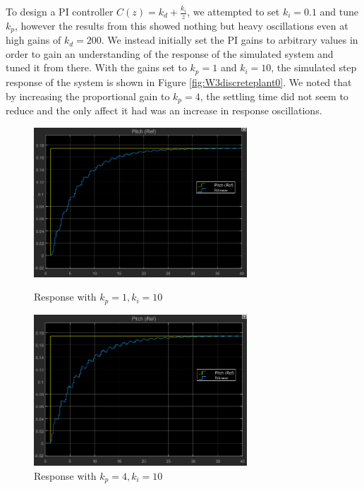 \documentclass[11pt]{article}
\begin{document}
To design a PI controller $C(z) = k_d + \frac{k_i}{z}$, we attempted to set $k_i=0.1$ and tune $k_p$, however the results from this showed nothing but heavy oscillations even at high gains of $k_d = 200$. We instead initially set the PI gains to arbitrary values in order to gain an understanding of the response of the simulated system and tuned it from there. With the gains set to $k_p = 1$ and $k_i = 10$, the simulated step response of the system is shown in Figure \ref{fig:W3discreteplant0}. We noted that by increasing the proportional gain to $k_p = 4$, the settling time did not seem to reduce and the only affect it had was an increase in response oscillations. \\

\begin{figure}[H]
\begin{minipage}{.5\textwidth}
    \centering
    \includegraphics[width=8cm]{plots/discreteplant_sim_ki10_kp1.png}
    \caption{\small{Response with $k_{p}=1, k_{i}=10$}}
    \label{fig:W3discreteplant0}
\end{minipage}%
\begin{minipage}{.5\textwidth}
    \centering
    \includegraphics[width=8cm]{plots/discreteplant_sim_ki10_kp4.png}
    \caption{\small{Response with $k_{p}=4, k_{i}=10$}}
    \label{fig:W3discreteplant1}
\end{minipage}
\end{figure}
\end{document}
